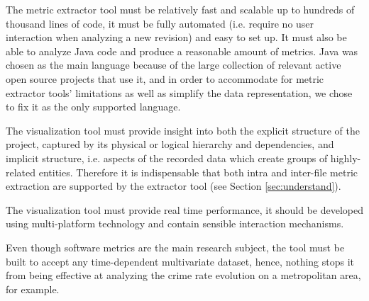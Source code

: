 The metric extractor tool must be relatively fast and scalable up to hundreds of thousand lines of code, it must be fully automated (i.e. require no user interaction when analyzing a new revision) and easy to set up. It must also be able to analyze Java code and produce a reasonable amount of metrics. Java was chosen as the main language because of the large collection of relevant active open source projects that use it, and in order to accommodate for metric extractor tools' limitations as well as simplify the data representation, we chose to fix it as the only supported language.

The visualization tool must provide insight into both the explicit structure of the project, captured by its physical or logical hierarchy and dependencies, and implicit structure, i.e. aspects of the recorded data which create groups of highly-related entities. Therefore it is indispensable that both intra and inter-file metric extraction are supported by the extractor tool (see Section \ref{sec:understand}).

The visualization tool must provide real time performance, it should be developed using multi-platform technology and contain sensible interaction mechanisms.

Even though software metrics are the main research subject, the tool must be built to accept any time-dependent multivariate dataset, hence, nothing stops it from being effective at analyzing the crime rate evolution on a metropolitan area, for example.
